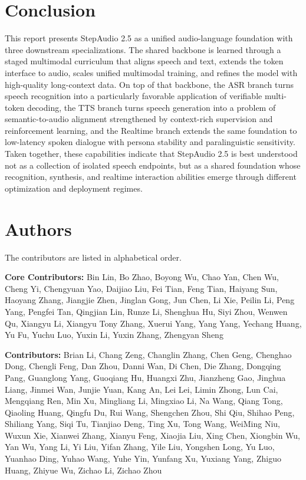 \documentclass{llmxive}
\begin{document}
\section{Conclusion}
\label{sec:conclusion}

This report presents StepAudio 2.5 as a unified audio-language foundation with three downstream specializations. The shared backbone is learned through a staged multimodal curriculum that aligns speech and text, extends the token interface to audio, scales unified multimodal training, and refines the model with high-quality long-context data. On top of that backbone, the ASR branch turns speech recognition into a particularly favorable application of verifiable multi-token decoding, the TTS branch turns speech generation into a problem of semantic-to-audio alignment strengthened by context-rich supervision and reinforcement learning, and the Realtime branch extends the same foundation to low-latency spoken dialogue with persona stability and paralinguistic sensitivity. Taken together, these capabilities indicate that StepAudio 2.5 is best understood not as a collection of isolated speech endpoints, but as a shared foundation whose recognition, synthesis, and realtime interaction abilities emerge through different optimization and deployment regimes.

\section*{Authors}
The contributors are listed in alphabetical order.

\vspace{0.5em}
\textbf{Core Contributors:}
Bin Lin,
Bo Zhao,
Boyong Wu,
Chao Yan,
Chen Wu,
Cheng Yi,
Chengyuan Yao,   %
Daijiao Liu,
Fei Tian,
Feng Tian,   %
Haiyang Sun,
Haoyang Zhang,
Jiangjie Zhen,   %
Jinglan Gong,
Jun Chen,
Li Xie,   %
Peilin Li,   %
Peng Yang,
Pengfei Tan,
Qingjian Lin,
Runze Li,
Shenghua Hu,   %
Siyi Zhou,
Wenwen Qu,   %
Xiangyu Li,   %
Xiangyu Tony Zhang,
Xuerui Yang,   %
Yang Yang,   %
Yechang Huang,
Yu Fu,
Yuchu Luo,   %
Yuxin Li,
Yuxin Zhang,
Zhengyan Sheng

\vspace{0.5em}
\textbf{Contributors:}
Brian Li,
Chang Zeng,
Changlin Zhang,
Chen Geng,
Chenghao Dong,
Chengli Feng,
Dan Zhou,
Danni Wan,
Di Chen,
Die Zhang,
Dongqing Pang,
Guanglong Yang,
Guoqiang Hu,
Huangxi Zhu,
Jianzheng Gao,
Jinghua Liang,
Jinmei Wan,
Junjie Yuan,
Kang An,
Lei Lei,
Limin Zhong,
Lun Cai,
Mengqiang Ren,
Min Xu,
Mingliang Li,
Mingxiao Li,
Na Wang,
Qiang Tong,
Qiaoling Huang,
Qingfu Du,
Rui Wang,
Shengchen Zhou,
Shi Qiu,
Shihao Peng,
Shiliang Yang,
Siqi Tu,
Tianjiao Deng,
Ting Xu,
Tong Wang,
WeiMing Niu,
Wuxun Xie,
Xianwei Zhang,
Xianyu Feng,
Xiaojia Liu,
Xing Chen,
Xiongbin Wu,
Yan Wu,
Yang Li,
Yi Liu,
Yifan Zhang,
Yile Liu,
Yongshen Long,
Yu Luo,
Yuanhao Ding,
Yuhao Wang,
Yuhe Yin,
Yunfang Xu,
Yuxiang Yang,
Zhiguo Huang,
Zhiyue Wu,
Zichao Li,
Zichao Zhou
\end{document}
